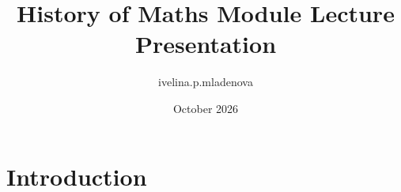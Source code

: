 \documentclass{article}
\title{History of Maths Module Lecture Presentation}
\author{ivelina.p.mladenova }
\date{October 2026}
\begin{document}
\maketitle

\section{Introduction}
\end{document}
